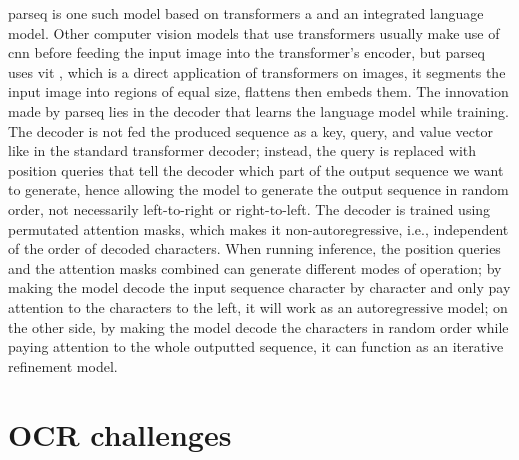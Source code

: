 \gls{parseq} \cite{bautista_scene_2022} is one such model based on transformers a and an integrated language model. Other computer vision models that use transformers usually make use of \gls{cnn} before feeding the input image into the transformer's encoder, but \gls{parseq} uses \gls{vit} \cite{dosovitskiy_image_2021}, which is a direct application of transformers on images, it segments the input image into regions of equal size, flattens then embeds them. The innovation made by \gls{parseq} lies in the decoder that learns the language model while training. The decoder is not fed the produced sequence as a key, query, and value vector like in the standard transformer decoder; instead, the query is replaced with position queries that tell the decoder which part of the output sequence we want to generate, hence allowing the model to generate the output sequence in random order, not necessarily left-to-right or right-to-left. The decoder is trained using permutated attention masks, which makes it non-autoregressive, i.e., independent of the order of decoded characters. When running inference, the position queries and the attention masks combined can generate different modes of operation; by making the model decode the input sequence character by character and only pay attention to the characters to the left, it will work as an autoregressive model; on the other side, by making the model decode the characters in random order while paying attention to the whole outputted sequence, it can function as an iterative refinement model.

\section{OCR challenges}

